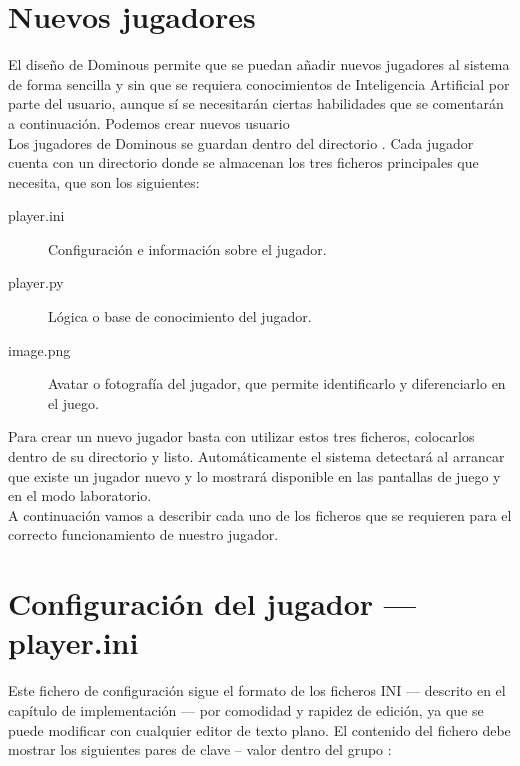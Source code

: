 


\section{Nuevos jugadores}

El diseño de Dominous permite que se puedan añadir nuevos jugadores al sistema de forma sencilla y sin que se requiera
conocimientos de Inteligencia Artificial por parte del usuario, aunque sí se necesitarán ciertas habilidades que se
comentarán a continuación. Podemos crear nuevos usuario \\

Los jugadores de Dominous se guardan dentro del directorio . Cada jugador cuenta con un directorio
donde se almacenan los tres ficheros principales que necesita, que son los siguientes:

\begin{description}
    \item[player.ini] Configuración e información sobre el jugador.
    \item[player.py] Lógica o base de conocimiento del jugador.
    \item[image.png] Avatar o fotografía del jugador, que permite identificarlo y diferenciarlo en el juego.
\end{description}

Para crear un nuevo jugador basta con utilizar estos tres ficheros, colocarlos dentro de su directorio y listo. Automáticamente
el sistema detectará al arrancar que existe un jugador nuevo y lo mostrará disponible en las pantallas de juego y en el
modo laboratorio. \\

A continuación vamos a describir cada uno de los ficheros que se requieren para el correcto funcionamiento de 
nuestro jugador.

\section{Configuración del jugador --- player.ini}

Este fichero de configuración sigue el formato de los ficheros INI --- descrito en el capítulo de implementación --- por
comodidad y rapidez de edición, ya que se puede modificar con cualquier editor de texto plano. El contenido del fichero
debe mostrar los siguientes pares de clave -- valor dentro del grupo :

